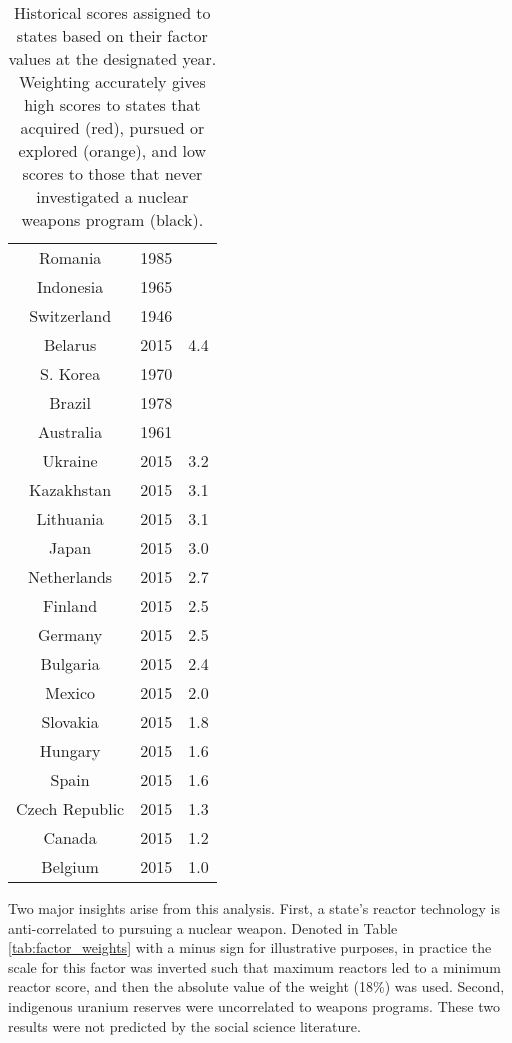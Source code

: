 \begin{table}
\begin{minipage}{.5\textwidth}
\begin{tabular}{|c|c|c|}
Romania & 1985 & \color{red}{4.5} \\
Indonesia & 1965 & \color{red}{4.4} \\
Switzerland & 1946 & \color{red}{4.4} \\
Belarus & 2015 & 4.4 \\
S. Korea & 1970 & \color{red}{4.4} \\
Brazil & 1978 & \color{red}{4.3} \\
Australia & 1961 & \color{red}{3.9} \\
Ukraine & 2015 & 3.2 \\
Kazakhstan & 2015 & 3.1 \\
Lithuania & 2015 & 3.1 \\
Japan & 2015 & 3.0 \\
Netherlands & 2015 & 2.7 \\
Finland & 2015 & 2.5 \\
Germany & 2015 & 2.5 \\
Bulgaria & 2015 & 2.4 \\
Mexico & 2015 & 2.0 \\
Slovakia & 2015 & 1.8 \\
Hungary & 2015 & 1.6 \\
Spain & 2015 & 1.6 \\
Czech Republic & 2015 & 1.3 \\
Canada & 2015 & 1.2 \\
Belgium & 2015 & 1.0 \\
\hline
\end{tabular}
\end{minipage}\hfill
\caption{Historical scores assigned to states based on their factor values at the designated year. Weighting accurately gives high scores to states that acquired (red), pursued or explored (orange), and low scores to those that never investigated a nuclear weapons program (black).} %
\label{tab:state_scores}
\end{table}


Two major insights arise from this analysis. First, a state's reactor technology is anti-correlated to pursuing a nuclear weapon.  Denoted in Table \ref{tab:factor_weights} with a minus sign for illustrative purposes, in practice the scale for this factor was inverted such that maximum reactors led to a minimum reactor score, and then the absolute value of the weight (18\%) was used.  Second, indigenous uranium reserves were uncorrelated to weapons programs. These two results were not predicted by the social science literature.



